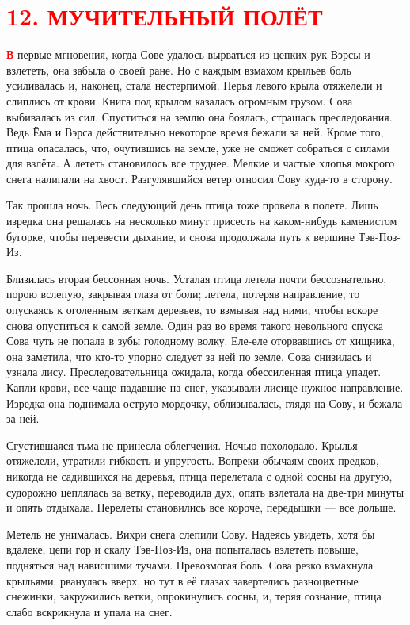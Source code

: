 \documentclass[12pt, a4paper, openany]{book}
\begin{document}
	
		\section[12. Мучительный полёт]{\center \textcolor{red}{12. МУЧИТЕЛЬНЫЙ ПОЛЁТ}}
	
	
	\lettrine[findent=0pt]{\textbf{\textcolor{red}{В}}}{} первые мгновения, когда Сове удалось вырваться из цепких рук Вэрсы и взлететь, она забыла о своей ране. Но с каждым взмахом крыльев боль усиливалась и, наконец, стала нестерпимой. Перья левого крыла отяжелели и слиплись от крови. Книга под крылом казалась огромным грузом. Сова выбивалась из сил. Спуститься на землю она боялась, страшась преследования. Ведь Ёма и Вэрса действительно некоторое время бежали за ней. Кроме того, птица опасалась, что, очутившись на земле, уже не сможет собраться с силами для взлёта. А лететь становилось все труднее. Мелкие и частые хлопья мокрого снега налипали на хвост. Разгулявшийся ветер относил Сову куда-то в сторону.
	
	Так прошла ночь. Весь следующий день птица тоже провела в полете. Лишь изредка она решалась на несколько минут присесть на каком-нибудь каменистом бугорке, чтобы перевести дыхание, и снова продолжала путь к вершине Тэв-Поз-Из.
	
	Близилась вторая бессонная ночь. Усталая птица летела почти бессознательно, порою вслепую, закрывая глаза от боли; летела, потеряв направление, то опускаясь к оголенным веткам деревьев, то взмывая над ними, чтобы вскоре снова опуститься к самой земле. Один раз во время такого невольного спуска Сова чуть не попала в зубы голодному волку. Еле-еле оторвавшись от хищника, она заметила, что кто-то упорно следует за ней по земле. Сова снизилась и узнала лису. Преследовательница ожидала, когда обессиленная птица упадет. Капли крови, все чаще падавшие на снег, указывали лисице нужное направление. Изредка она поднимала острую мордочку, облизывалась, глядя на Сову, и бежала за ней.
	
	Сгустившаяся тьма не принесла облегчения. Ночью похолодало. Крылья отяжелели, утратили гибкость и упругость. Вопреки обычаям своих предков, никогда не садившихся на деревья, птица перелетала с одной сосны на другую, судорожно цеплялась за ветку, переводила дух, опять взлетала на две-три минуты и опять отдыхала. Перелеты становились все короче, передышки — все дольше.
	
	Метель не унималась. Вихри снега слепили Сову. Надеясь увидеть, хотя бы вдалеке, цепи гор и скалу Тэв-Поз-Из, она попыталась взлететь повыше, подняться над нависшими тучами. Превозмогая боль, Сова резко взмахнула крыльями, рванулась вверх, но тут в её глазах завертелись разноцветные снежинки, закружились ветки, опрокинулись сосны, и, теряя сознание, птица слабо вскрикнула и упала на снег.
	
\end{document}
